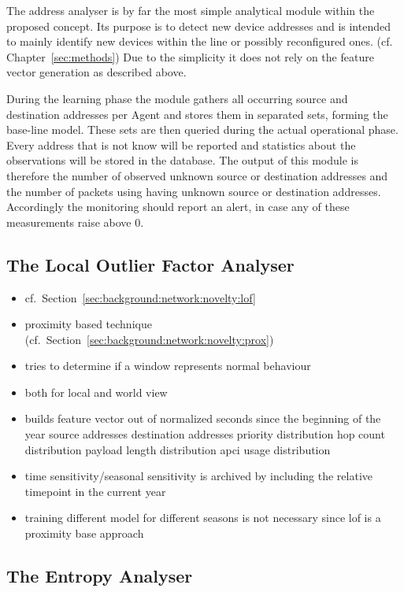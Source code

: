 The address analyser is by far the most simple analytical module within the proposed concept.
Its purpose is to detect new device addresses and is intended to mainly identify new devices within the line or possibly reconfigured ones. (cf. Chapter~\ref{sec:methods})
Due to the simplicity it does not rely on the feature vector generation as described above.

During the learning phase the module gathers all occurring source and destination addresses per Agent and stores them in separated sets, forming the base-line model.
These sets are then queried during the actual operational phase. Every address that is not know will be reported and statistics about the observations will be stored in the database.
The output of this module is therefore the number of observed unknown source or destination addresses and the number of packets using having unknown source or destination addresses.
Accordingly the monitoring should report an alert, in case any of these measurements raise above 0.

\subsection{The Local Outlier Factor Analyser}
\label{sec:concept:anal:lof}

\begin{itemize}
	\item cf.~Section~\ref{sec:background:network:novelty:lof}
	\item proximity based technique (cf.~Section~\ref{sec:background:network:novelty:prox})
	\item tries to determine if a window represents normal behaviour
	\item both for local and world view
	\item builds feature vector out of
		\subitem normalized seconds since the beginning of the year
		\subitem source addresses
		\subitem destination addresses
		\subitem priority distribution
		\subitem hop count distribution
		\subitem payload length distribution
		\subitem \gls{apci} usage distribution
	\item time sensitivity/seasonal sensitivity is archived by including the relative timepoint in the current year
	\item training different model for different seasons is not necessary since \gls{lof} is a proximity base approach
\end{itemize}

\subsection{The Entropy Analyser}
\label{sec:concept:anal:entropy}

